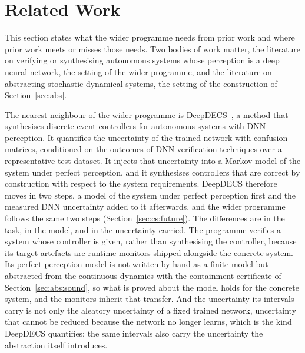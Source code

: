 \documentclass[11pt,a4paper]{article}
\theoremstyle{plain}
\theoremstyle{remark}
\begin{document}
	\section{Related Work}
	\label{sec:rw}
	
	This section states what the wider programme needs from prior work and where prior work meets or misses those needs. Two bodies of work matter, the literature on verifying or synthesising autonomous systems whose perception is a deep neural network, the setting of the wider programme, and the literature on abstracting stochastic dynamical systems, the setting of the construction of Section~\ref{sec:abs}.
	
	The nearest neighbour of the wider programme is DeepDECS~\cite{DeepDECS24}, a method that synthesises discrete-event controllers for autonomous systems with DNN perception. It quantifies the uncertainty of the trained network with confusion matrices, conditioned on the outcomes of DNN verification techniques over a representative test dataset. It injects that uncertainty into a Markov model of the system under perfect perception, and it synthesises controllers that are correct by construction with respect to the system requirements. DeepDECS therefore moves in two steps, a model of the system under perfect perception first and the measured DNN uncertainty added to it afterwards, and the wider programme follows the same two steps (Section~\ref{sec:cs:future}). The differences are in the task, in the model, and in the uncertainty carried. The programme verifies a system whose controller is given, rather than synthesising the controller, because its target artefacts are runtime monitors shipped alongside the concrete system. Its perfect-perception model is not written by hand as a finite model but abstracted from the continuous dynamics with the containment certificate of Section~\ref{sec:abs:sound}, so what is proved about the model holds for the concrete system, and the monitors inherit that transfer. And the uncertainty its intervals carry is not only the aleatory uncertainty of a fixed trained network, uncertainty that cannot be reduced because the network no longer learns, which is the kind DeepDECS quantifies; the same intervals also carry the uncertainty the abstraction itself introduces.
	
\end{document}
